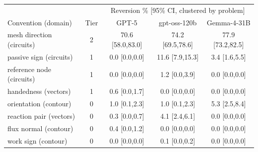 \begin{tabular}{lcccc}
\toprule
 & & \multicolumn{3}{c}{Reversion \% [95\% CI, clustered by problem]} \\
Convention (domain) & Tier & GPT-5 & gpt-oss-120b & Gemma-4-31B \\
\midrule
mesh direction (circuits) & 2 & 70.6 [58.0,83.0] & 74.2 [69.5,78.6] & 77.9 [73.2,82.5] \\
passive sign (circuits) & 1 & 0.0 [0.0,0.0] & 11.6 [7.9,15.3] & 3.4 [1.6,5.5] \\
reference node (circuits) & 1 & 0.0 [0.0,0.0] & 1.2 [0.0,3.9] & 0.0 [0.0,0.0] \\
handedness (vectors) & 1 & 0.6 [0.0,1.7] & 0.0 [0.0,0.0] & 0.0 [0.0,0.0] \\
orientation (contour) & 0 & 1.0 [0.1,2.3] & 1.0 [0.1,2.3] & 5.3 [2.5,8.4] \\
reaction pair (vectors) & 0 & 0.3 [0.0,0.7] & 4.1 [2.4,6.1] & 0.0 [0.0,0.0] \\
flux normal (contour) & 0 & 0.4 [0.0,1.2] & 0.0 [0.0,0.0] & 0.0 [0.0,0.0] \\
work sign (contour) & 0 & 0.0 [0.0,0.0] & 0.1 [0.0,0.2] & 0.0 [0.0,0.0] \\
\bottomrule
\end{tabular}

